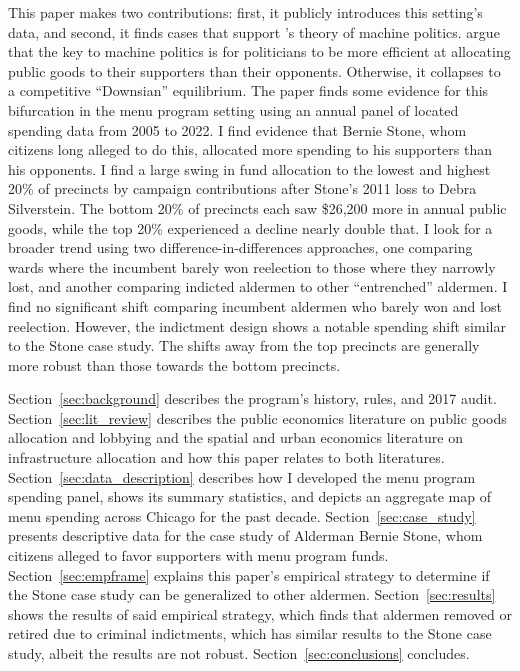 This paper makes two contributions: first, it publicly introduces this setting's data, and second, it finds cases that support \cite{dixit_londregan1996}'s theory of machine politics.
\cite{dixit_londregan1996} argue that the key to machine politics is for politicians to be more efficient at allocating public goods to their supporters than their opponents.
Otherwise, it collapses to a competitive ``Downsian'' equilibrium.
The paper finds some evidence for this bifurcation in the menu program setting using an annual panel of located spending data from 2005 to 2022.
I find evidence that Bernie Stone, whom citizens long alleged to do this, allocated more spending to his supporters than his opponents.
I find a large swing in fund allocation to the lowest and highest 20\% of precincts by campaign contributions after Stone's 2011 loss to Debra Silverstein. 
The bottom 20\% of precincts each saw \$26,200 more in annual public goods, while the top 20\% experienced a decline nearly double that.
I look for a broader trend using two difference-in-differences approaches, one comparing wards where the incumbent barely won reelection to those where they narrowly lost, and another comparing indicted aldermen to other ``entrenched'' aldermen.
I find no significant shift comparing incumbent aldermen who barely won and lost reelection.
However, the indictment design shows a notable spending shift similar to the Stone case study.
The shifts away from the top precincts are generally more robust than those towards the bottom precincts.



Section~\ref{sec:background} describes the program's history, rules, and 2017 audit.
Section~\ref{sec:lit_review} describes the public economics literature on public goods allocation and lobbying and the spatial and urban economics literature on infrastructure allocation and how this paper relates to both literatures.
Section~\ref{sec:data_description} describes how I developed the menu program spending panel, shows its summary statistics, and depicts an
aggregate map of menu spending across Chicago for the past decade.
Section~\ref{sec:case_study} presents descriptive data for the case study of Alderman Bernie Stone, whom citizens alleged to favor supporters with menu program funds. 
Section~\ref{sec:empframe} explains this paper's empirical strategy to determine if the Stone case study can be generalized to other aldermen.
Section~\ref{sec:results} shows the results of said empirical strategy, which finds that aldermen removed or retired due to criminal indictments, which has similar results to the Stone case study, albeit the results are not robust. 
Section~\ref{sec:conclusions} concludes.

